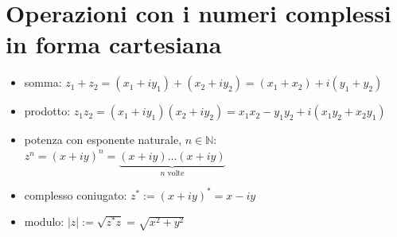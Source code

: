 \documentclass[letterpaper,10pt,italian]{jupyterBook}
\begin{document}
\section{Operazioni con i numeri complessi \sphinxhyphen{} in forma cartesiana}
\label{\detokenize{ch/algebra/complex-algebra:operazioni-con-i-numeri-complessi-in-forma-cartesiana}}\label{\detokenize{ch/algebra/complex-algebra:math-hs-algebra-complex-operations-0}}\begin{itemize}
\item {} 
\sphinxAtStartPar
somma: \(z_1 + z_2 = (x_1 + i y_1) + (x_2 + i y_2) = (x_1 + x_2) + i (y_1 + y_2)\)

\item {} 
\sphinxAtStartPar
prodotto: \(z_1 z_2 = (x_1 + i y_1)(x_2 + i y_2) = x_1 x_2 - y_1 y_2 + i (x_1 y_2 + x_2 y_1)\)

\item {} 
\sphinxAtStartPar
potenza con esponente naturale, \(n \in \mathbb{N}\): \(z^n = (x + i y)^n = \underbrace{(x+iy) \dots (x+iy)}_{n \text{ volte}}\)

\item {} 
\sphinxAtStartPar
complesso coniugato: \(z^* := (x+iy)^* = x - i y\)

\item {} 
\sphinxAtStartPar
modulo: \(|z| := \sqrt{z^* z} = \sqrt{x^2 + y^2}\)

\end{itemize}
\label{ch/algebra/complex-algebra:example-1}
\end{document}
